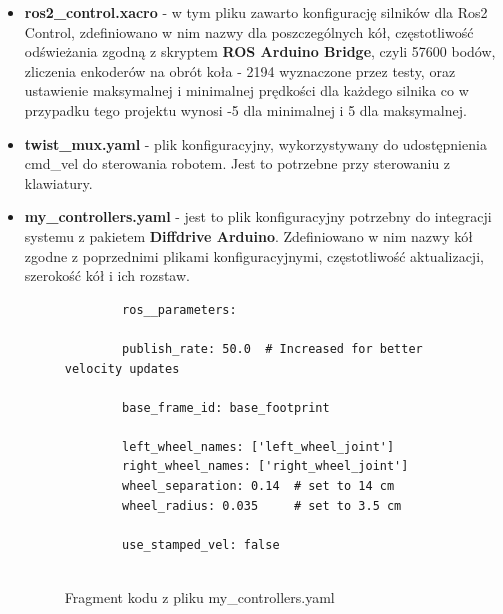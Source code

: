 \documentclass[a4paper,twoside,12pt]{book}
\begin{document}
\begin{itemize}
	\item \textbf{ros2\_control.xacro} - w tym pliku zawarto konfigurację silników dla Ros2 Control, zdefiniowano w nim nazwy dla poszczególnych kół, częstotliwość odświeżania zgodną z skryptem \textbf{ROS Arduino Bridge}, czyli 57600 bodów, zliczenia enkoderów na obrót koła - 2194 wyznaczone przez testy, oraz ustawienie maksymalnej i minimalnej prędkości dla każdego silnika co w przypadku tego projektu wynosi -5 dla minimalnej i 5 dla maksymalnej.
	\item \textbf{twist\_mux.yaml} - plik konfiguracyjny, wykorzystywany do udostępnienia cmd\_vel do sterowania robotem. Jest to potrzebne przy sterowaniu z klawiatury.
	\newpage \item \textbf{my\_controllers.yaml} - jest to plik konfiguracyjny potrzebny do integracji systemu z pakietem \textbf{Diffdrive Arduino}. Zdefiniowano w nim nazwy kół zgodne z poprzednimi plikami konfiguracyjnymi, częstotliwość aktualizacji, szerokość kół i ich rozstaw.
	\begin{figure}[!hb]
		\centering
	\begin{lstlisting}
		ros__parameters:

		publish_rate: 50.0  # Increased for better velocity updates
	
		base_frame_id: base_footprint 
	
		left_wheel_names: ['left_wheel_joint']
		right_wheel_names: ['right_wheel_joint']
		wheel_separation: 0.14  # set to 14 cm
		wheel_radius: 0.035     # set to 3.5 cm
	
		use_stamped_vel: false
	
		\end{lstlisting}
		\caption{Fragment kodu z pliku my\_controllers.yaml}
		\label{fig:my-controllers}
	\end{figure}
\end{itemize}
\newpage
\end{document}
